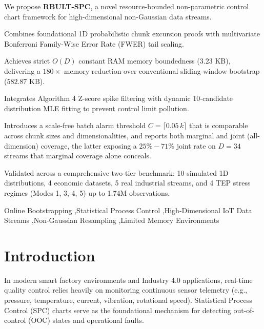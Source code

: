 \documentclass[a4paper,fleqn]{cas-sc}
\begin{document}
\begin{highlights}
\item We propose \textbf{RBULT-SPC}, a novel resource-bounded non-parametric control chart framework for high-dimensional non-Gaussian data streams.
\item Combines foundational 1D probabilistic chunk excursion proofs with multivariate Bonferroni Family-Wise Error Rate (FWER) tail scaling.
\item Achieves strict $O(D)$ constant RAM memory boundedness ($3.23\text{ KB}$), delivering a $180\times$ memory reduction over conventional sliding-window bootstrap ($582.87\text{ KB}$).
\item Integrates Algorithm 4 Z-score spike filtering with dynamic 10-candidate distribution MLE fitting to prevent control limit pollution.
\item Introduces a scale-free batch alarm threshold $C = \lceil 0.05\,k \rceil$ that is comparable across chunk sizes and dimensionalities, and reports both marginal and joint (all-dimension) coverage, the latter exposing a $25\%-71\%$ joint rate on $D=34$ streams that marginal coverage alone conceals.
\item Validated across a comprehensive two-tier benchmark: 10 simulated 1D distributions, 4 economic datasets, 5 real industrial streams, and 4 TEP stress regimes (Modes 1, 3, 4, 5) up to 1.74M observations.
\end{highlights}

\begin{keywords}
Online Bootstrapping \sep Statistical Process Control \sep High-Dimensional IoT Data Streams \sep Non-Gaussian Resampling \sep Limited Memory Environments
\end{keywords}

\maketitle

\section{Introduction}\label{sec1_intro}
In modern smart factory environments and Industry 4.0 applications, real-time quality control relies heavily on monitoring continuous sensor telemetry (e.g., pressure, temperature, current, vibration, rotational speed). Statistical Process Control (SPC) charts serve as the foundational mechanism for detecting out-of-control (OOC) states and operational faults.
\end{document}
